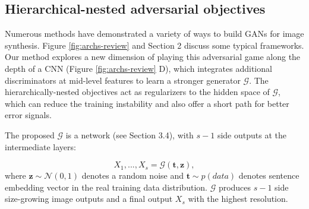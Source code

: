 \documentclass[10pt,twocolumn,letterpaper]{article}
\begin{document}
\subsection{Hierarchical-nested adversarial objectives}
Numerous methods have demonstrated a variety of ways to build GANs for image synthesis. Figure \ref{fig:archs-review} and Section 2 discuss some typical frameworks.
Our method explores a new dimension of playing this adversarial game along the depth of a CNN (Figure \ref{fig:archs-review} D), which integrates additional discriminators at mid-level features to learn a stronger generator $\mathcal{G}$. 
The hierarchically-nested objectives 
act as regularizers to the hidden space of $\mathcal{G}$, which can reduce the training instability and also offer a short path for better error signals.

The proposed $\mathcal{G}$ is a network (see Section 3.4), with $s{-}1$ side outputs at the intermediate layers:

\begin{equation}
\label{side}
X_1,..., X_s = \mathcal{G}(\bm t, \bm z), 
\end{equation}
where $\bm z\sim\mathcal{N}(0,1)$ denotes a random noise and $\bm t\sim p(data)$ denotes sentence embedding vector in the real training data distribution. $\mathcal{G}$ produces $s-1$ side size-growing image outputs and a final output $X_s$ with the highest resolution.

\end{document}
